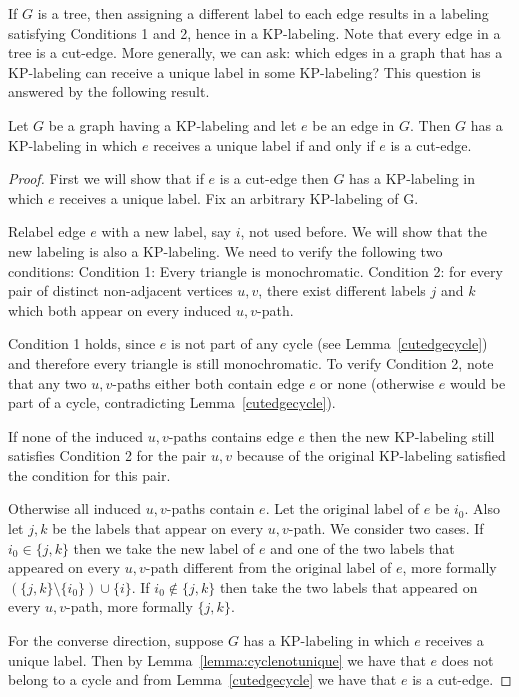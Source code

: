 \documentclass[12pt,a4paper,titlepage,openany]{report}
\begin{document}
If $G$ is a tree, then assigning a different label to each edge results in a labeling satisfying Conditions 1 and 2, hence in a KP-labeling. Note that every edge in a tree is a cut-edge. More generally, we can ask: which edges in a graph that has a KP-labeling can receive a unique label in some KP-labeling? This question is answered by the following result.
\begin{proposition}
Let $G$ be a graph having a KP-labeling and let $e$ be an edge in $G$. Then $G$ has a KP-labeling in which $e$ receives a unique label if and only if $e$ is a cut-edge.
\end{proposition}

\begin{proof}
First we will show that if $e$ is a cut-edge then $G$ has a KP-labeling in which $e$ receives a unique label. Fix an arbitrary KP-labeling of G.

Relabel edge $e$ with a new label, say $i$, not used before. We will show that the new labeling is also a KP-labeling. We need to verify the following two conditions:
\newline
Condition 1: Every triangle is monochromatic.\newline
Condition 2: for every pair of distinct non-adjacent vertices $u,v$, there exist different labels $j$ and $k$ which both appear on every induced $u,v$-path.

Condition 1 holds, since $e$ is not part of any cycle (see Lemma~\ref{cutedgecycle}) and therefore every triangle is still monochromatic.
To verify Condition 2, note that any two $u,v$-paths either both contain edge $e$ or none (otherwise $e$ would be part of a cycle,
contradicting Lemma~\ref{cutedgecycle}).

If none of the induced $u,v$-paths contains edge $e$ then the new KP-labeling still satisfies Condition 2 for the pair $u,v$ because of the original KP-labeling satisfied the condition for this pair.

Otherwise all induced $u,v$-paths contain $e$. Let the original label of $e$ be $i_0$. Also let $j,k$ be the labels that appear on every $u,v$-path. We consider two cases. If $i_0\in \{j,k\}$ then we take the new label of $e$ and one of the two labels that appeared on every $u,v$-path
different from the original label of $e$, more formally $(\{j,k\}\setminus \{i_0\})\cup \{i\}$. If $i_0\not\in \{j,k\}$ then take the two labels that appeared on every $u,v$-path, more formally $\{j,k\}$.

For the converse direction, suppose $G$ has a KP-labeling in which $e$ receives a unique label. Then by Lemma~\ref{lemma:cyclenotunique}  we have that $e$ does not belong to a cycle and from Lemma~\ref{cutedgecycle} we have that $e$ is a cut-edge.
\end{proof}
\end{document}
